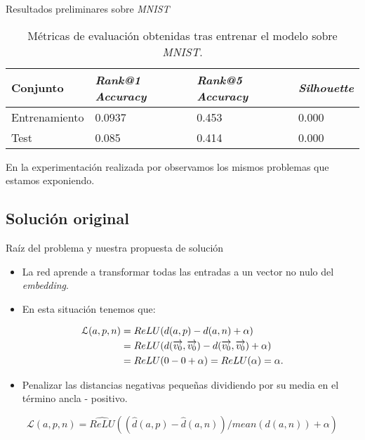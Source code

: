 \begin{frame}{Resultados preliminares sobre \textit{MNIST}}

	\begin{table}
		\centering
		\begin{tabular}{|l|l|l|l|}
			\hline
			Conjunto      & \textit{Rank@1 Accuracy} & \textit{Rank@5 Accuracy} & \textit{Silhouette} \\
			\hline

			Entrenamiento & 0.0937                   & 0.453                    & 0.000               \\
			Test          & 0.085                    & 0.414                    & 0.000               \\


			\hline
		\end{tabular}
		\caption{Métricas de evaluación obtenidas tras entrenar el modelo sobre \textit{MNIST}.}
		\label{table:resultados_mnist_mal}
	\end{table}

	En la experimentación realizada por \cite{informatica:adambielski_github} observamos los mismos problemas que estamos exponiendo.

\end{frame}

\subsection{Solución original}
\begin{frame}{Raíz del problema y nuestra propuesta de solución}
	\begin{itemize}
		\item La red aprende a transformar todas las entradas a un vector no nulo del \textit{embedding}.
		\item En esta situación tenemos que:
	\end{itemize}

	\begin{equation} \label{eq:justificacion_relu}
		\begin{split}
			\mathcal{L}(a, p, n) &= ReLU(d(a, p) - d(a, n) + \alpha) \\
			&= ReLU(d(\overrightarrow{v_0}, \overrightarrow{v_0}) - d(\overrightarrow{v_0}, \overrightarrow{v_0}) + \alpha) \\
			&= ReLU(0 - 0 + \alpha) = ReLU(\alpha) = \alpha.
		\end{split}
	\end{equation}

	\begin{itemize}
		\item Penalizar las distancias negativas pequeñas dividiendo por su media en el término ancla - positivo.
	\end{itemize}
	\begin{equation}
		\mathcal{L}(a, p, n) = \widehat{ReLU}((\widehat{d}(a, p) - \widehat{d}(a, n)) / mean(d(a, n)) + \alpha)
	\end{equation}

\end{frame}

